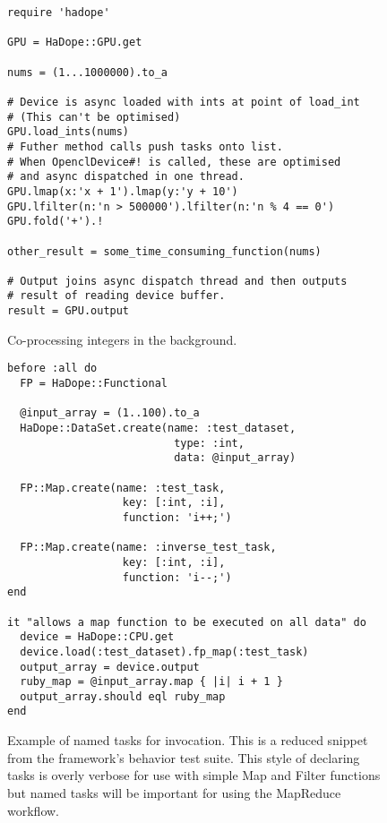 \begin{figure*}
\begin{lstlisting}
require 'hadope'

GPU = HaDope::GPU.get
 
nums = (1...1000000).to_a
 
# Device is async loaded with ints at point of load_int
# (This can't be optimised)
GPU.load_ints(nums)
# Futher method calls push tasks onto list.
# When OpenclDevice#! is called, these are optimised
# and async dispatched in one thread.
GPU.lmap(x:'x + 1').lmap(y:'y + 10')
GPU.lfilter(n:'n > 500000').lfilter(n:'n % 4 == 0')
GPU.fold('+').!
 
other_result = some_time_consuming_function(nums)
 
# Output joins async dispatch thread and then outputs
# result of reading device buffer.
result = GPU.output
\end{lstlisting}
\caption{Co-processing integers in the background.}
\label{snippet}
\end{figure*}

\begin{figure*}
\begin{lstlisting}
before :all do
  FP = HaDope::Functional

  @input_array = (1..100).to_a
  HaDope::DataSet.create(name: :test_dataset,
                          type: :int,
                          data: @input_array)

  FP::Map.create(name: :test_task,
                  key: [:int, :i],
                  function: 'i++;')

  FP::Map.create(name: :inverse_test_task,
                  key: [:int, :i],
                  function: 'i--;')
end

it "allows a map function to be executed on all data" do
  device = HaDope::CPU.get
  device.load(:test_dataset).fp_map(:test_task)
  output_array = device.output
  ruby_map = @input_array.map { |i| i + 1 }
  output_array.should eql ruby_map
end
\end{lstlisting}
\caption{Example of named tasks for invocation. This is a reduced snippet from the framework's behavior test suite. This style of declaring tasks is overly verbose for use with simple Map and Filter functions but named tasks will be important for using the MapReduce workflow.}
\label{named-tasks}
\end{figure*}

